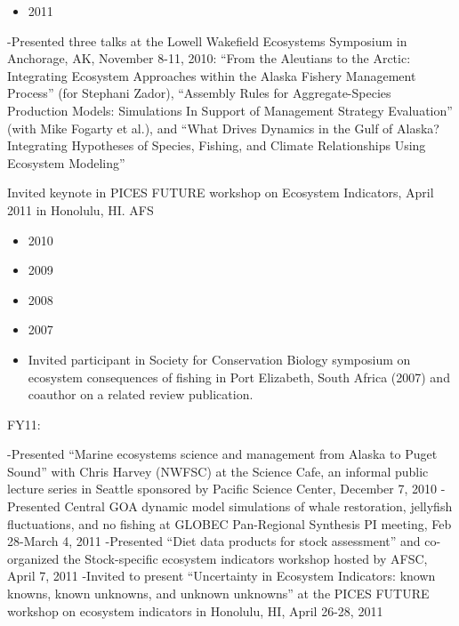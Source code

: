 \documentclass[11pt, a4paper]{awesome-cv}
\providecommand{\tightlist}{%
	\setlength{\itemsep}{0pt}\setlength{\parskip}{0pt}}
\begin{document}
\begin{itemize}
\tightlist
\item
  2011
\end{itemize}

-Presented three talks at the Lowell Wakefield Ecosystems Symposium in
Anchorage, AK, November 8-11, 2010: ``From the Aleutians to the Arctic:
Integrating Ecosystem Approaches within the Alaska Fishery Management
Process'' (for Stephani Zador), ``Assembly Rules for Aggregate-Species
Production Models: Simulations In Support of Management Strategy
Evaluation'' (with Mike Fogarty et al.), and ``What Drives Dynamics in
the Gulf of Alaska? Integrating Hypotheses of Species, Fishing, and
Climate Relationships Using Ecosystem Modeling''

Invited keynote in PICES FUTURE workshop on Ecosystem Indicators, April
2011 in Honolulu, HI. AFS

\begin{itemize}
\item
  2010
\item
  2009
\item
  2008
\item
  2007
\item
  Invited participant in Society for Conservation Biology symposium on
  ecosystem consequences of fishing in Port Elizabeth, South Africa
  (2007) and coauthor on a related review publication.
\end{itemize}

FY11:

-Presented ``Marine ecosystems science and management from Alaska to
Puget Sound'' with Chris Harvey (NWFSC) at the Science Cafe, an informal
public lecture series in Seattle sponsored by Pacific Science Center,
December 7, 2010 -Presented Central GOA dynamic model simulations of
whale restoration, jellyfish fluctuations, and no fishing at GLOBEC
Pan-Regional Synthesis PI meeting, Feb 28-March 4, 2011 -Presented
``Diet data products for stock assessment'' and co-organized the
Stock-specific ecosystem indicators workshop hosted by AFSC, April 7,
2011 -Invited to present ``Uncertainty in Ecosystem Indicators: known
knowns, known unknowns, and unknown unknowns'' at the PICES FUTURE
workshop on ecosystem indicators in Honolulu, HI, April 26-28, 2011
\end{document}
